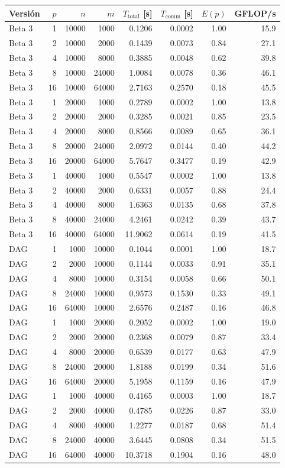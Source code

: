 \begin{tabular}{lrrrrrrr}
\toprule
Versión & $p$ & $n$ & $m$ & $T_{\text{total}}$ [s] & $T_{\text{comm}}$ [s] & $E(p)$ & GFLOP/s \\
\midrule
Beta 3 & 1 & 10000 & 1000 & 0.1206 & 0.0002 & 1.00 & 15.9 \\
Beta 3 & 2 & 10000 & 2000 & 0.1439 & 0.0073 & 0.84 & 27.1 \\
Beta 3 & 4 & 10000 & 8000 & 0.3885 & 0.0048 & 0.62 & 39.8 \\
Beta 3 & 8 & 10000 & 24000 & 1.0084 & 0.0078 & 0.36 & 46.1 \\
Beta 3 & 16 & 10000 & 64000 & 2.7163 & 0.2570 & 0.18 & 45.5 \\
\midrule
Beta 3 & 1 & 20000 & 1000 & 0.2789 & 0.0002 & 1.00 & 13.8 \\
Beta 3 & 2 & 20000 & 2000 & 0.3285 & 0.0021 & 0.85 & 23.5 \\
Beta 3 & 4 & 20000 & 8000 & 0.8566 & 0.0089 & 0.65 & 36.1 \\
Beta 3 & 8 & 20000 & 24000 & 2.0972 & 0.0144 & 0.40 & 44.2 \\
Beta 3 & 16 & 20000 & 64000 & 5.7647 & 0.3477 & 0.19 & 42.9 \\
\midrule
Beta 3 & 1 & 40000 & 1000 & 0.5547 & 0.0002 & 1.00 & 13.8 \\
Beta 3 & 2 & 40000 & 2000 & 0.6331 & 0.0057 & 0.88 & 24.4 \\
Beta 3 & 4 & 40000 & 8000 & 1.6363 & 0.0135 & 0.68 & 37.8 \\
Beta 3 & 8 & 40000 & 24000 & 4.2461 & 0.0242 & 0.39 & 43.7 \\
Beta 3 & 16 & 40000 & 64000 & 11.9062 & 0.0614 & 0.19 & 41.5 \\
\midrule
DAG & 1 & 1000 & 10000 & 0.1044 & 0.0001 & 1.00 & 18.7 \\
DAG & 2 & 2000 & 10000 & 0.1144 & 0.0033 & 0.91 & 35.1 \\
DAG & 4 & 8000 & 10000 & 0.3154 & 0.0058 & 0.66 & 50.1 \\
DAG & 8 & 24000 & 10000 & 0.9573 & 0.1530 & 0.33 & 49.1 \\
DAG & 16 & 64000 & 10000 & 2.6576 & 0.2487 & 0.16 & 46.8 \\
\midrule
DAG & 1 & 1000 & 20000 & 0.2052 & 0.0002 & 1.00 & 19.0 \\
DAG & 2 & 2000 & 20000 & 0.2368 & 0.0079 & 0.87 & 33.4 \\
DAG & 4 & 8000 & 20000 & 0.6539 & 0.0177 & 0.63 & 47.9 \\
DAG & 8 & 24000 & 20000 & 1.8188 & 0.0199 & 0.34 & 51.6 \\
DAG & 16 & 64000 & 20000 & 5.1958 & 0.1159 & 0.16 & 47.9 \\
\midrule
DAG & 1 & 1000 & 40000 & 0.4165 & 0.0003 & 1.00 & 18.7 \\
DAG & 2 & 2000 & 40000 & 0.4785 & 0.0226 & 0.87 & 33.0 \\
DAG & 4 & 8000 & 40000 & 1.2277 & 0.0187 & 0.68 & 51.4 \\
DAG & 8 & 24000 & 40000 & 3.6445 & 0.0808 & 0.34 & 51.5 \\
DAG & 16 & 64000 & 40000 & 10.3718 & 0.1904 & 0.16 & 48.0 \\
\bottomrule
\end{tabular}
